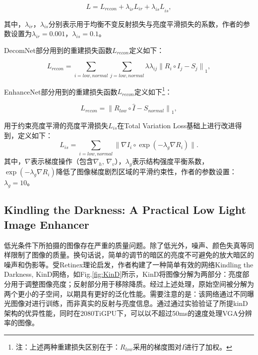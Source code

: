 \documentclass[letterpaper,12pt]{article}
\begin{document}
	\begin{equation}
		L=L_{recon}+\lambda_{ir}L_{ir}+{\lambda_{is}L}_{is},
	\end{equation}
	
	其中，$\lambda_{ir}$，$\lambda_{is}$分别表示用于均衡不变反射损失与亮度平滑损失的系数，作者的参数设置为$\lambda_{ir}=0.001$，$\lambda_{is}=0.1$。
	
	DecomNet部分用到的重建损失函数$L_{recon}$定义如下：
	
	\begin{equation}
		L_{recon}=\sum_{i=low,normal}\sum_{j=low,normal}λ\lambda_{ij}{\big\|R_{i} \circ I_{j}-S_{j}\big\|}_{1},
	\end{equation}
	
	EnhanceNet部分用到的重建损失函数$L_{recon}$定义如下\footnote{注：上述两种重建损失区别在于：$R_{low}$采用的梯度图对$\hat{I}$进行了加权。}：
	
	\begin{equation}
		L_{recon}={\big\|  R_{low} \circ \hat{I} - S_{normal} \big\|}_{1},
    \end{equation}
	
	用于约束亮度平滑的亮度平滑损失$L_{is}$在Total Variation Loss基础上进行改进得到，定义如下：
	\begin{equation}
		L_{is}=\sum_{i=low,normal}{\big\|\nabla I_{i} \circ \exp (-{\lambda_{g}\nabla R_{i}}) \big\|}.
    \end{equation}
	其中，$\nabla$表示梯度操作（包含$\nabla_h$, $\nabla_v$），$\lambda_g$表示结构强度平衡系数，$\exp\left(-\lambda_g\nabla R_i\right)$降低了图像梯度剧烈区域的平滑约束性，作者的参数设置：$\lambda_g=10$。
	
	\subsection{Kindling the Darkness: A Practical Low Light Image Enhancer}
	
	低光条件下所拍摄的图像存在严重的质量问题。除了低光外，噪声、颜色失真等同样限制了图像的质量。换句话说，简单的调节的暗区的亮度不可避免的放大暗区的噪声和伪影等。受Retinex理论启发，作者构建了一种简单有效的网络Kindling the Darkness, KinD网络，如Fig.\ref{fig:KinD}所示，KinD将图像分解为两部分：亮度部分用于调整图像亮度；反射部分用于移除降质。经过上述处理，原始空间被分解为两个更小的子空间，以期具有更好的泛化性能。需要注意的是：该网络通过不同曝光图像对进行训练，而非真实的反射与亮度信息。通过通过实验验证了所提kinD架构的优异性能，同时在2080TiGPU下，可以以不超过50ms的速度处理VGA分辨率的图像。
	
\end{document}
